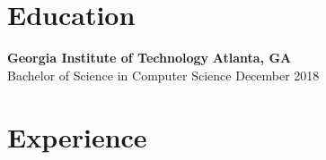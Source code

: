 \documentclass[line]{resume}
\begin{document}
\begin{center}
\end{center}
\vspace{-9px}
\section{Education}
\textbf{Georgia Institute of Technology} \hfill \textbf{Atlanta, GA} \\
Bachelor of Science in Computer Science  \hfill December 2018

\vspace{-3px}
\section{Experience}
\vspace{-1px}
\end{document}
